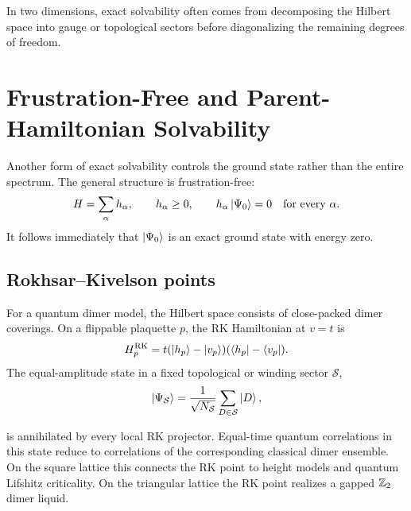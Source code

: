 \begin{principle}
In two dimensions, exact solvability often comes from decomposing the Hilbert space into gauge or topological sectors before diagonalizing the remaining degrees of freedom.
\end{principle}

\section{Frustration-Free and Parent-Hamiltonian Solvability}
\label{sec:frustration-free-parent-synthesis}

Another form of exact solvability controls the ground state rather than the entire spectrum.  The general structure is frustration-free:
\begin{equation}
\label{eq:conclusion-frustration-free}
    H=\sum_\alpha h_\alpha,
    \qquad
    h_\alpha\geq0,
    \qquad
    h_\alpha\left|\Psi_0\right\rangle=0
    \quad
    \text{for every }\alpha.
\end{equation}
It follows immediately that \(\left|\Psi_0\right\rangle\) is an exact ground state with energy zero.

\subsection{Rokhsar--Kivelson points}

For a quantum dimer model, the Hilbert space consists of close-packed dimer coverings.  On a flippable plaquette \(p\), the RK Hamiltonian at \(v=t\) is
\begin{equation}
\label{eq:conclusion-rk-projector}
    H_p^{\rm RK}
    =
    t
    (\left|h_p\right\rangle-\left|v_p\right\rangle)(\left\langle h_p\right|-\left\langle v_p\right|).
\end{equation}
The equal-amplitude state in a fixed topological or winding sector \(\mathcal{S}\),
\begin{equation}
\label{eq:conclusion-rk-ground-state}
    \left|\Psi_{\mathcal{S}}\right\rangle
    =
    \frac{1}{\sqrt{N_{\mathcal{S}}}}
    \sum_{D\in\mathcal{S}}\left|D\right\rangle,
\end{equation}

is annihilated by every local RK projector.  Equal-time quantum correlations in this state reduce to correlations of the corresponding classical dimer ensemble.  On the square lattice this connects the RK point to height models and quantum Lifshitz criticality.  On the triangular lattice the RK point realizes a gapped \(\mathbb{Z}_2\) dimer liquid.

